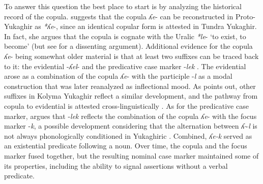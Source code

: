 \documentclass[output=paper,colorlinks,citecolor=brown
\ChapterDOI{10.5281/zenodo.15697581}
]{langscibook}
\begin{document}
To answer this question the best place to start is by analyzing the historical record of the copula. 
\citet{Nikolaeva2006, Nikolaeva2020} suggests that the copula \textit{ʎe}- can be reconstructed in Proto-Yukaghir as \textit{*ʎe}-, since an identical copular form is attested in Tundra Yukaghir. 
In fact, she argues that the copula is cognate with the Uralic \textit{*le}- `to exist, to become' (but see \citealt{Aikio2014} for a dissenting argument). 
Additional evidence for the copula \textit{ʎe}- being somewhat older material is that at least two suffixes can be traced back to it: the evidential -\textit{ʎel}- and the predicative case marker -\textit{lek} \citep{Nikolaeva2020}. 
The evidential arose as a combination of the copula \textit{ʎe}- with the participle -\textit{l} as a modal construction that was later reanalyzed as inflectional mood. As \citet{Nikolaeva2020} points out, other suffixes in Kolyma Yukaghir reflect a similar development, and the pathway from copula to evidential is attested cross-linguistically \citep{Aikhenvald2004}. 
As for the predicative case marker, \citet{Nikolaeva2020} argues that -\textit{lek} reflects the combination of the copula \textit{ʎe}- with the focus marker -\textit{k}, a possible development considering that the alternation between \textit{ʎ}\sim\textit{l} is not always phonologically conditioned in Yukaghiric \citep{Nikolaeva2020}.
Combined, \textit{ʎe-k} served as an existential predicate following a noun. 
Over time, the copula and the focus marker fused together, but the resulting nominal case marker maintained some of its properties, including the ability to signal assertions without a verbal predicate. 

\end{document}
